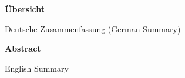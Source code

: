 \documentclass{maddoc}
\begin{document}
\begin{center}
\bfseries
Übersicht
\normalfont
\end{center}
Deutsche Zusammenfassung (German Summary)

\vspace{5.0cm}

\begin{center}
\bfseries
Abstract
\normalfont
\end{center}
English Summary

\tableofcontents
\cleardoublepage





\appendix

\end{document}
